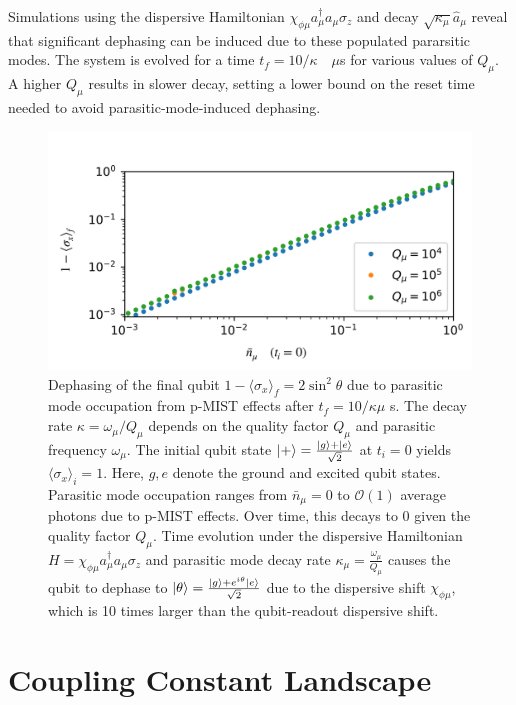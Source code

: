 \documentclass[prx,showpacs,notitlepage,twocolumn,superscriptaddress,nofootinbib,preprintnumbers,floatfix]{revtex4-2}
\begin{document}
Simulations using the dispersive Hamiltonian $\chi_{\phi\mu}a_\mu^\dagger a_\mu \sigma_z$ and decay $\sqrt{\kappa_\mu}\hat a_\mu$ reveal that significant dephasing can be induced due to these populated pararsitic modes. The system is evolved for a time $t_f=10/\kappa\quad \mu$s for various values of $Q_\mu$. A higher $Q_\mu$ results in slower decay, setting a lower bound on the reset time needed to avoid parasitic-mode-induced dephasing.
\begin{figure}
    \centering
    \includegraphics[width=\linewidth]{Figures/dephasing.pdf}
    \caption{Dephasing of the final qubit $1-\langle \sigma_x \rangle_f = 2\sin^2 \theta$ due to parasitic mode occupation from p-MIST effects after $t_f = 10/\kappa \mu$ s. The decay rate $\kappa=\omega_\mu/Q_\mu$ depends on the quality factor $Q_\mu$ and parasitic frequency $\omega_\mu$. The initial qubit state $\ket{+} = \frac{\ket{g} + \ket{e}}{\sqrt{2}}$ at $t_i = 0$ yields $\langle \sigma_x \rangle_i = 1$. Here, $g, e$ denote the ground and excited qubit states. Parasitic mode occupation ranges from $ \bar{n}_\mu = 0$ to $\mathcal{O}(1)$ average photons due to p-MIST effects. Over time, this decays to 0 given the quality factor $Q_\mu$. Time evolution under the dispersive Hamiltonian $H = \chi_{\phi\mu}a_\mu^\dagger a_\mu\sigma_z$ and parasitic mode decay rate $\kappa_\mu = \frac{\omega_\mu}{Q_\mu}$ causes the qubit to dephase to $\ket{\theta}=\frac{\ket{g} + e^{i\theta}\ket{e}}{\sqrt{2}}$ due to the dispersive shift $\chi_{\phi\mu}$, which is 10 times larger than the qubit-readout dispersive shift. }
    \label{fig:dephasing}
\end{figure}

\section{Coupling Constant Landscape}\label{app:coupling}
\end{document}

